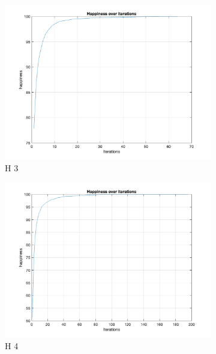 \documentclass[unicode,11pt,a4paper,oneside,numbers=endperiod,openany]{scrartcl}
\begin{document}
\begin{figure}[H]
\begin{subfigure}[b]{0.45\textwidth}
        \includegraphics[width=\textwidth]{Convergence/ConvergenceH3Random_1.png}
        \caption{H 3}
        \label{fig:image12}
    \end{subfigure}
    \begin{subfigure}[b]{0.45\textwidth}
        \includegraphics[width=\textwidth]{Convergence/ConvergenceH4Random_1.png}
        \caption{H 4}
        \label{fig:image13}
      \end{subfigure}
      \begin{subfigure}[b]{0.45\textwidth}

\end{subfigure}
\end{figure}
\end{document}
